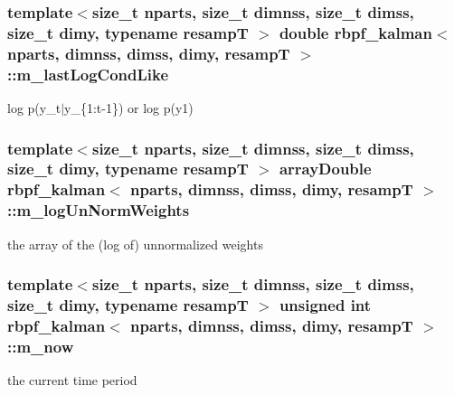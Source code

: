 \subsubsection[{\texorpdfstring{m\+\_\+last\+Log\+Cond\+Like}{m_lastLogCondLike}}]{\setlength{\rightskip}{0pt plus 5cm}template$<$size\+\_\+t nparts, size\+\_\+t dimnss, size\+\_\+t dimss, size\+\_\+t dimy, typename resampT $>$ double {\bf rbpf\+\_\+kalman}$<$ nparts, dimnss, dimss, dimy, resampT $>$\+::m\+\_\+last\+Log\+Cond\+Like\hspace{0.3cm}{\ttfamily [private]}}\hypertarget{classrbpf__kalman_a6e0e835d26a8df872090e95f0168caa6}{}\label{classrbpf__kalman_a6e0e835d26a8df872090e95f0168caa6}
log p(y\+\_\+t$\vert$y\+\_\+\{1\+:t-\/1\}) or log p(y1) 
\subsubsection[{\texorpdfstring{m\+\_\+log\+Un\+Norm\+Weights}{m_logUnNormWeights}}]{\setlength{\rightskip}{0pt plus 5cm}template$<$size\+\_\+t nparts, size\+\_\+t dimnss, size\+\_\+t dimss, size\+\_\+t dimy, typename resampT $>$ {\bf array\+Double} {\bf rbpf\+\_\+kalman}$<$ nparts, dimnss, dimss, dimy, resampT $>$\+::m\+\_\+log\+Un\+Norm\+Weights\hspace{0.3cm}{\ttfamily [private]}}\hypertarget{classrbpf__kalman_a69bf4f905a84e8b003e732763a06a264}{}\label{classrbpf__kalman_a69bf4f905a84e8b003e732763a06a264}
the array of the (log of) unnormalized weights 
\subsubsection[{\texorpdfstring{m\+\_\+now}{m_now}}]{\setlength{\rightskip}{0pt plus 5cm}template$<$size\+\_\+t nparts, size\+\_\+t dimnss, size\+\_\+t dimss, size\+\_\+t dimy, typename resampT $>$ unsigned int {\bf rbpf\+\_\+kalman}$<$ nparts, dimnss, dimss, dimy, resampT $>$\+::m\+\_\+now\hspace{0.3cm}{\ttfamily [private]}}\hypertarget{classrbpf__kalman_aa463a5411c640a8cd3b4c48a691bf9c1}{}\label{classrbpf__kalman_aa463a5411c640a8cd3b4c48a691bf9c1}
the current time period 
